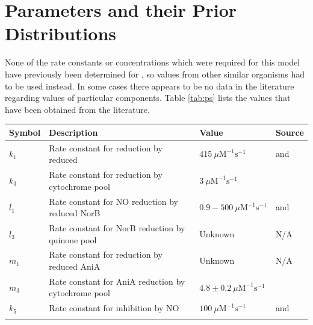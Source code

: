 \section{Parameters and their Prior Distributions}

None of the rate constants or concentrations which were required for this model have previously been determined for \Nsm, so values from other similar organisms had to be used instead. In some cases there appears to be no data in the literature regarding values of particular components. Table \ref{tab:ps} lists the values that have been obtained from the literature.

\begin{table}[tbp]
\begin{center}
\begin{tabular}{>{\centering}m{1.6cm}>{\centering}m{6.1cm}>{\centering}m{2.5cm}>{\centering}m{3.1cm}}
\toprule
\textbf{Symbol} & \textbf{Description} & \textbf{Value} & \textbf{Source}
\tabularnewline
\midrule
$k_1$ & Rate constant for \cOxygen{} reduction by reduced \cbbthree{} & $415~\mu \mathrm{M}^{-1} \mathrm{s}^{-1}$ & \citet{Forte2001} and \citet{Hunter2007}
\tabularnewline\noalign{\smallskip}\hline\noalign{\smallskip}

$k_3$ & Rate constant for \cbbthree{} reduction by cytochrome pool & $3~\mu \mathrm{M}^{-1} \mathrm{s}^{-1}$ & \citet{Chang2010}
\tabularnewline\noalign{\smallskip}\hline\noalign{\smallskip}

$l_1$ & Rate constant for NO reduction by reduced NorB & $0.9 - 500~\mu \mathrm{M}^{-1} \mathrm{s}^{-1}$ & \citet{Rock2007} and \citet{Wasser2002}
\tabularnewline\noalign{\smallskip}\hline\noalign{\smallskip}

$l_3$ & Rate constant for NorB reduction by quinone pool & Unknown & N/A
\tabularnewline\noalign{\smallskip}\hline\noalign{\smallskip}

$m_1$ & Rate constant for \cNitrite{} reduction by reduced AniA & Unknown & N/A
\tabularnewline\noalign{\smallskip}\hline\noalign{\smallskip}

$m_3$ & Rate constant for AniA reduction by cytochrome pool & $4.8\pm0.2~\mu \mathrm{M}^{-1}\mathrm{s}^{-1}$ & \citet{Nojiri2009}
\tabularnewline\noalign{\smallskip}\hline\noalign{\smallskip}

$k_5$ & Rate constant for \cbbthree{} inhibition by NO & $100~\mu \mathrm{M} ^{-1} \mathrm{s} ^{-1}$ & \citet{Giuffre2000} and \citet{Blackmore1991}
\tabularnewline\noalign{\smallskip}\hline\noalign{\smallskip}


\end{tabular}
\end{center}
\end{table}
